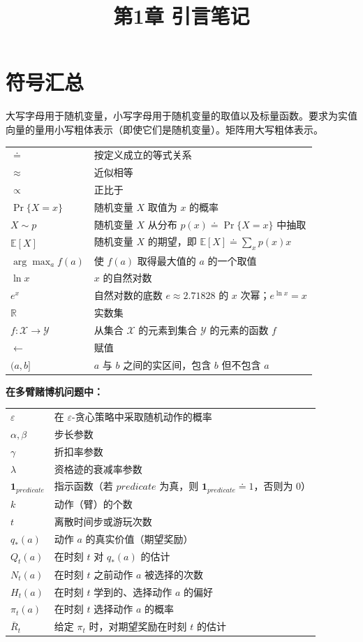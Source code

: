\documentclass[UTF8,12pt,a4paper,fontset=fandol]{ctexart}
\title{第1章 引言笔记}
\author{}
\date{}
\begin{document}
\maketitle

\section*{符号汇总}

大写字母用于随机变量，小写字母用于随机变量的取值以及标量函数。要求为实值向量的量用小写粗体表示（即使它们是随机变量）。矩阵用大写粗体表示。

\begin{longtable}{p{}p{}}
$\doteq$ & 按定义成立的等式关系 \\
$\approx$ & 近似相等 \\
$\propto$ & 正比于 \\
$\Pr\{X=x\}$ & 随机变量 $X$ 取值为 $x$ 的概率 \\
$X\sim p$ & 随机变量 $X$ 从分布 $p(x)\doteq\Pr\{X=x\}$ 中抽取 \\
$\mathbb{E}[X]$ & 随机变量 $X$ 的期望，即 $\mathbb{E}[X]\doteq\sum_x p(x)x$ \\
$\arg\max_a f(a)$ & 使 $f(a)$ 取得最大值的 $a$ 的一个取值 \\
$\ln x$ & $x$ 的自然对数 \\
$e^x$ & 自然对数的底数 $e\approx2.71828$ 的 $x$ 次幂；$e^{\ln x}=x$ \\
$\mathbb{R}$ & 实数集 \\
$f:\mathcal{X}\to\mathcal{Y}$ & 从集合 $\mathcal{X}$ 的元素到集合 $\mathcal{Y}$ 的元素的函数 $f$ \\
$\leftarrow$ & 赋值 \\
$(a,b]$ & $a$ 与 $b$ 之间的实区间，包含 $b$ 但不包含 $a$ \\
\end{longtable}

\noindent\textbf{在多臂赌博机问题中：}
\begin{longtable}{p{}p{}}
$\varepsilon$ & 在 $\varepsilon$-贪心策略中采取随机动作的概率 \\
$\alpha,\beta$ & 步长参数 \\
$\gamma$ & 折扣率参数 \\
$\lambda$ & 资格迹的衰减率参数 \\
$\mathbf{1}_{predicate}$ & 指示函数（若 $predicate$ 为真，则 $\mathbf{1}_{predicate}\doteq1$，否则为 $0$） \\
$k$ & 动作（臂）的个数 \\
$t$ & 离散时间步或游玩次数 \\
$q_*(a)$ & 动作 $a$ 的真实价值（期望奖励） \\
$Q_t(a)$ & 在时刻 $t$ 对 $q_*(a)$ 的估计 \\
$N_t(a)$ & 在时刻 $t$ 之前动作 $a$ 被选择的次数 \\
$H_t(a)$ & 在时刻 $t$ 学到的、选择动作 $a$ 的偏好 \\
$\pi_t(a)$ & 在时刻 $t$ 选择动作 $a$ 的概率 \\
$\bar R_t$ & 给定 $\pi_t$ 时，对期望奖励在时刻 $t$ 的估计 \\
\end{longtable}
\end{document}
